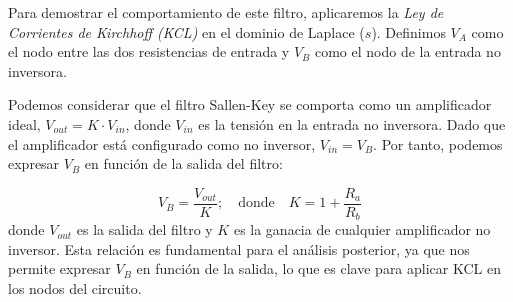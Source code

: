 \begin{marginfigure}
    \centering
    \shorthandoff{>}
    \caption[Filtro activo paso bajo Sallen-Key de segundo orden.]{Filtro activo paso bajo Sallen-Key de segundo orden equivalente al filtro RLC pasivo. Presenta una caída de \qty{40}{dB/decada} tras la frecuencia de corte.}\label{fig:sallen_key}
\end{marginfigure}

Para demostrar el comportamiento de este filtro, aplicaremos la \emph{Ley de Corrientes de Kirchhoff (KCL)} en el dominio de Laplace ($s$). Definimos $V_A$ como el nodo entre las dos resistencias de entrada y $V_B$ como el nodo de la entrada no inversora.

Podemos considerar que el filtro Sallen-Key se comporta como un amplificador ideal, $V_{out} = K \cdot V_{in}$, donde $V_{in}$ es la tensión en la entrada no inversora. Dado que el amplificador está configurado como no inversor, $V_{in} = V_B$. Por tanto, podemos expresar $V_B$ en función de la salida del filtro:

\begin{equation}\label{eq:vb_val}
    V_B = \frac{V_{out}}{K}; \quad \text{donde} \quad K = 1 + \frac{R_a}{R_b}
\end{equation}
donde $V_{out}$ es la salida del filtro y $K$  es la ganacia de cualquier amplificador no inversor. Esta relación es fundamental para el análisis posterior, ya que nos permite expresar $V_B$ en función de la salida, lo que es clave para aplicar KCL en los nodos del circuito.


